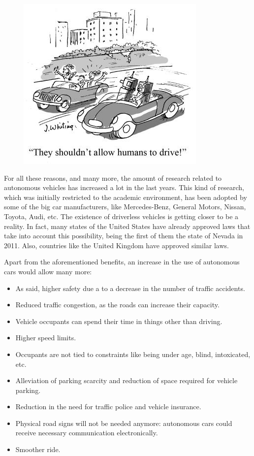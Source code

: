 \begin{figure}
  \centering
  \includegraphics{CarCartoon}
\end{figure}

For all these reasons, and many more, the amount of research related to autonomous vehicles has increased a lot in the last years. This kind of research, which was initially restricted to the academic environment, has been adopted by some of the big car manufacturers, like Mercedes-Benz, General Motors, Nissan, Toyota, Audi, etc. The existence of driverless vehicles is getting closer to be a reality. In fact, many states of the United States have already approved laws that take into account this possibility, being the first of them the state of Nevada in 2011. Also, countries like the United Kingdom have approved similar laws.

Apart from the aforementioned benefits, an increase in the use of autonomous cars would allow many more:
\begin{itemize}
 \item As said, higher safety due a to a decrease in the number of traffic accidents.
 \item Reduced traffic congestion, as the roads can increase their capacity.
 \item Vehicle occupants can spend their time in things other than driving.
 \item Higher speed limits.
 \item Occupants are not tied to constraints like being under age, blind, intoxicated, etc.
 \item Alleviation of parking scarcity and reduction of space required for vehicle parking.
 \item Reduction in the need for traffic police and vehicle insurance.
 \item Physical road signs will not be needed anymore: autonomous cars could receive necessary communication electronically.
 \item Smoother ride.
\end{itemize}

